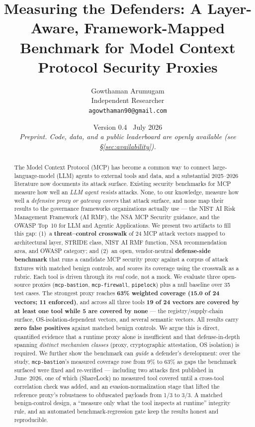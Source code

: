 \documentclass[11pt]{article}
\title{\textbf{Measuring the Defenders: A Layer-Aware, Framework-Mapped\\ Benchmark for Model Context Protocol Security Proxies}}
\author{%
  Gowthaman Arumugam\\
  \normalsize Independent Researcher\\
  \normalsize \texttt{agowthaman90@gmail.com}
}
\date{Version 0.4 \textperiodcentered\ July 2026 \\ \small\emph{Preprint. Code, data, and a public leaderboard are openly available (see \S\ref{sec:availability}).}}
\newcommand{\code}[1]{\texttt{\small #1}}
\begin{document}
\maketitle

\begin{abstract}
\noindent
The Model Context Protocol (MCP) has become a common way to connect large-language-model (LLM) agents to external tools and data, and a substantial 2025--2026 literature now documents its attack surface. Existing security benchmarks for MCP measure how well an \emph{LLM agent resists} attacks. None, to our knowledge, measure how well a \emph{defensive proxy or gateway covers} that attack surface, and none map their results to the governance frameworks organizations actually use --- the NIST AI Risk Management Framework (AI RMF), the NSA MCP Security guidance, and the OWASP Top~10 for LLM and Agentic Applications. We present two artifacts to fill this gap: (1)~a \textbf{threat--control crosswalk} of 24 MCP attack vectors mapped to architectural layer, STRIDE class, NIST AI RMF function, NSA recommendation area, and OWASP category; and (2)~an open, vendor-neutral \textbf{defense-side benchmark} that runs a candidate MCP security proxy against a corpus of attack fixtures with matched benign controls, and scores its coverage using the crosswalk as a rubric. Each tool is driven through its \emph{real} code, not a mock. We evaluate three open-source proxies (\code{mcp-bastion}, \code{mcp-firewall}, \code{pipelock}) plus a null baseline over 35 test cases. The strongest proxy reaches \textbf{63\% weighted coverage (15.0 of 24 vectors; 11 enforced)}, and across all three tools \textbf{19 of 24 vectors are covered by at least one tool while 5 are covered by none} --- the registry/supply-chain surface, OS-isolation-dependent vectors, and several semantic vectors. All results carry \textbf{zero false positives} against matched benign controls. We argue this is direct, quantified evidence that a runtime proxy alone is insufficient and that defense-in-depth spanning \emph{distinct mechanism classes} (proxy, cryptographic attestation, OS isolation) is required. We further show the benchmark can \emph{guide} a defender's development: over the study, \code{mcp-bastion}'s measured coverage rose from 9\% to 63\% as gaps the benchmark surfaced were fixed and re-verified --- including two attacks first published in June~2026, one of which (ShareLock) no measured tool covered until a cross-tool correlation check was added, and an evasion-normalization stage that lifted the reference proxy's robustness to obfuscated payloads from 1/3 to 3/3. A matched benign-control design, a ``measure only what the tool inspects at runtime'' integrity rule, and an automated benchmark-regression gate keep the results honest and reproducible.
\end{abstract}
\end{document}
